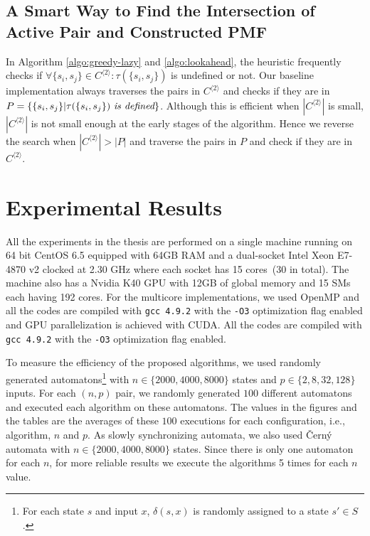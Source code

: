 \documentclass[12pt]{article}
\begin{document}
\subsection{A Smart Way to Find the Intersection of Active Pair and Constructed PMF}
\label{sec:smart}

In Algorithm \ref{algo:greedy-lazy} and \ref{algo:lookahead}, the heuristic frequently checks if $\forall \{ s_i,s_j \} \in C^{\langle 2 \rangle}: \tau(\{ s_i,s_j \})$ is undefined or not. Our baseline implementation always traverses the pairs in $C^{\langle 2 \rangle}$ and checks if they are in $P = \{ \{s_i, s_j \} | \tau(\{s_i, s_j \})~ \mbox{\em is defined} \}$. Although this is efficient when $|C^{\langle 2 \rangle}|$ is small, $|C^{\langle 2 \rangle}|$ is not small enough at the early stages of the algorithm. Hence we reverse the search when $|C^{\langle 2 \rangle}| > |P|$ and traverse the pairs in $P$ and check if they are in $C^{\langle 2 \rangle}$.





\clearpage
\section{Experimental Results}
\label{sec:results}

All the experiments in the thesis are performed on a single machine running on 64 bit CentOS 6.5 equipped with 64GB RAM and a dual-socket Intel Xeon E7-4870 v2 clocked at 2.30 GHz where each socket  has 15 cores~(30 in total). The machine also has a Nvidia K40 GPU with 12GB of global memory and 15 SMs each having 192 cores. For the multicore implementations, we used OpenMP and all the codes are compiled with {\tt gcc 4.9.2} with the {\tt -O3} optimization flag enabled and GPU parallelization is achieved with CUDA. All the codes are compiled with {\tt gcc 4.9.2} with the {\tt -O3} optimization flag enabled.

\sloppy
To measure the efficiency of the proposed algorithms, we used randomly generated automatons\footnote{For each state $s$ and input $x$, $\delta(s,x)$ is randomly assigned to a state $s' \in S$.} with $n  \in \{2000, 4000, 8000\}$ states and ${p \in \{2, 8, 32, 128\}}$ inputs. For each $(n, p)$ pair, we randomly generated $100$ different automatons and executed each algorithm on these automatons. The values in the figures and the tables are the averages of these $100$ executions for each configuration, i.e., algorithm, $n$ and $p$. As slowly synchronizing automata, we also used \v{C}ern\'y automata with $n  \in \{2000, 4000, 8000\}$ states. Since there is only one automaton for each $n$, for more reliable results we execute the algorithms 5 times for each $n$ value.
\end{document}
